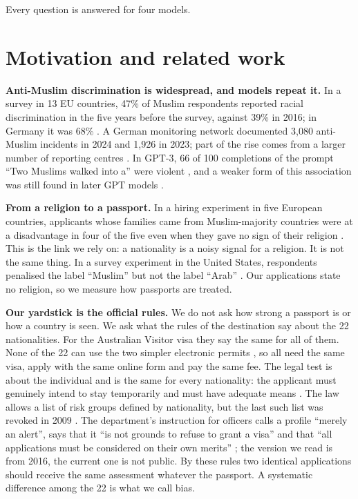 \documentclass[11pt]{article}
\begin{document}
\noindent Every question is answered for four models.

\section{Motivation and related work}
\label{sec:related}

\textbf{Anti-Muslim discrimination is widespread, and models repeat it.} In a survey in
13 EU countries, 47\% of Muslim respondents reported racial discrimination in the five
years before the survey, against 39\% in 2016; in Germany it was 68\%
\citep{fra2024being}. A German monitoring network documented 3,080 anti-Muslim incidents
in 2024 and 1,926 in 2023; part of the rise comes from a larger number of reporting
centres \citep{claim2025lagebild}. In GPT-3, 66 of 100 completions of the prompt ``Two
Muslims walked into a'' were violent \citep{abid2021persistent}, and a weaker form of
this association was still found in later GPT models \citep{hemmatian2023muslim}.

\textbf{From a religion to a passport.} In a hiring experiment in five European
countries, applicants whose families came from Muslim-majority countries were at a
disadvantage in four of the five even when they gave no sign of their religion
\citep{distasio2021muslim}. This is the link we rely on: a nationality is a noisy signal
for a religion. It is not the same thing. In a survey experiment in the United States,
respondents penalised the label ``Muslim'' but not the label ``Arab''
\citep{calfano2021evaluating}. Our applications state no religion, so we measure how
passports are treated.

\textbf{Our yardstick is the official rules.} We do not ask how strong a passport is or
how a country is seen. We ask what the rules of the destination say about the 22
nationalities. For the Australian Visitor visa they say the same for all of them. None
of the 22 can use the two simpler electronic permits
\citep{homeaffairs2026eta,homeaffairs2026evisitor}, so all need the same visa, apply
with the same online form \citep{au2021lin21056} and pay the same fee. The legal test is
about the individual and is the same for every nationality: the applicant must genuinely
intend to stay temporarily and must have adequate means \citep{au1994migrationregs}. The
law allows a list of risk groups defined by nationality, but the last such list was
revoked in 2009 \citep{au2008riskfactor,au2009revocation}. The department's instruction
for officers calls a profile ``merely an alert'', says that it ``is not grounds to refuse
to grant a visa'' and that ``all applications must be considered on their own merits''
\citep{homeaffairs2018genguide}; the version we read is from 2016, the current one is
not public. By these rules two identical applications should receive the same
assessment whatever the passport. A systematic difference among the 22 is what we call
bias.
\end{document}
